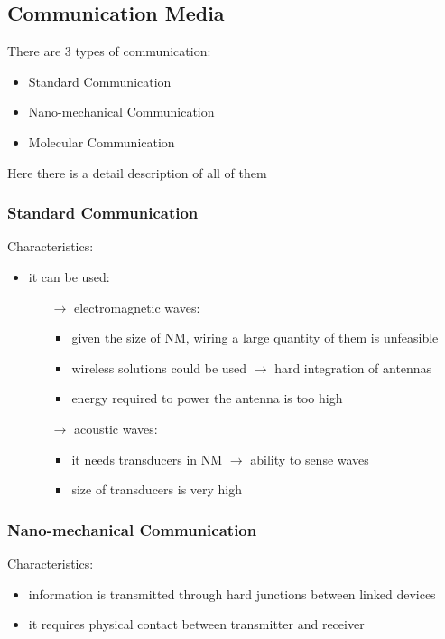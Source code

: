 \subsection{Communication Media}
There are 3 types of communication:
\begin{itemize}
    \item Standard Communication
    \item Nano-mechanical Communication
    \item Molecular Communication
\end{itemize}
Here there is a detail description of all of them
\subsubsection{Standard Communication}
Characteristics:
\begin{itemize}
    \item it can be used:
    \begin{itemize}
        \item[$\rightarrow$] electromagnetic waves:
        \begin{itemize}
            \item given the size of NM, wiring a large quantity
            of them is unfeasible
            \item wireless solutions could be used $\rightarrow$ hard
            integration of antennas
            \item energy required to power the antenna is too high
        \end{itemize}
        \newpage
        \item[$\rightarrow$] acoustic waves:
        \begin{itemize}
            \item it needs transducers in NM $\rightarrow$ ability to sense waves
            \item size of transducers is very high
        \end{itemize}
    \end{itemize}
\end{itemize}
\subsubsection{Nano-mechanical Communication}
Characteristics:
\begin{itemize}
    \item information is transmitted through hard junctions
    between linked devices
    \item it requires physical contact between
    transmitter and receiver
\end{itemize}
